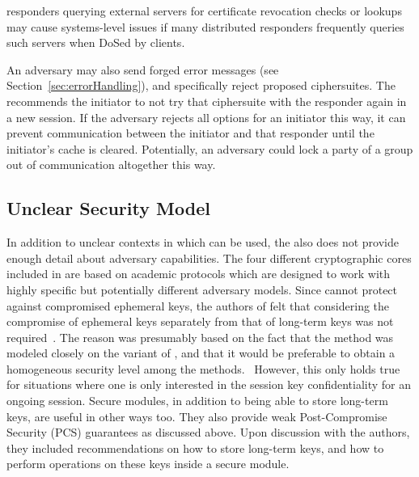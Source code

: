 \documentclass[runningheads]{llncs}
\begin{document}
\mEdhoc{} responders querying external servers for certificate revocation checks
or lookups may cause systems-level issues if many distributed \mEdhoc{}
responders frequently queries such servers when DoSed by clients.
%

An adversary may also send forged error messages (see
Section~\ref{sec:errorHandling}), and specifically reject proposed ciphersuites.
%
The \mEdhoc{} \mSpec{} recommends the initiator to not try that ciphersuite with
the responder again in a new session.
%
If the adversary rejects all options for an initiator this way, it can prevent
communication between the initiator and that responder until the initiator's
cache is cleared.
%
Potentially, an adversary could lock a party of a group out of communication
altogether this way.
%

\subsection{Unclear Security Model}
In addition to unclear contexts in which
\mEdhoc{} can be used, the \mSpec{} also does not provide enough detail about
adversary capabilities.
%
The four different cryptographic cores included in \mEdhoc{} are based on
academic protocols which are designed to work with highly specific but
potentially different adversary models.
%
Since \mSigma{} cannot protect against compromised ephemeral keys, the authors
of \mEdhoc{} felt that considering the compromise of ephemeral keys separately
from that of long-term keys was not required~\cite{personalCommunication}.
%
The reason was presumably based on the fact that the \mSigSig{} method was
modeled closely on the \mSigmaI{} variant of \mSigma{}, and that it would be
preferable to obtain a homogeneous security level among the \mEdhoc{}
methods.~\cite{Norr21}
%
However, this only holds true for situations where one is only interested in the
session key confidentiality for an ongoing session.
%
Secure modules, in addition to being able to store long-term keys, are useful in
other ways too.
%
They also provide weak Post-Compromise Security (PCS) guarantees as discussed
above.
%
Upon discussion with the authors, they included recommendations on how to store
long-term keys, and how to perform operations on these keys inside a secure
module.
%
\end{document}
